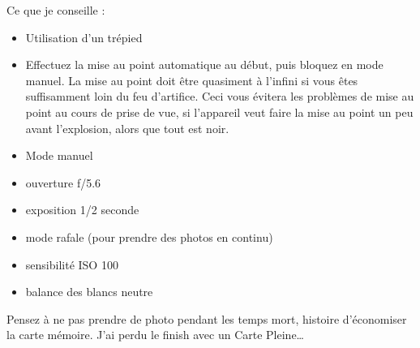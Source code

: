 \documentclass[a4paper,twoside]{article}
\begin{document}
Ce que je conseille : 
\begin{itemize}
\item Utilisation d'un trépied
\item Effectuez la mise au point automatique au début, puis bloquez en mode manuel. La mise au point doit être quasiment à l'infini si vous êtes suffisamment loin du feu d'artifice. Ceci vous évitera les problèmes de mise au point au cours de prise de vue, si l'appareil veut faire la mise au point un peu avant l'explosion, alors que tout est noir.
\item Mode manuel
\item ouverture f/5.6
\item exposition 1/2 seconde
\item mode rafale (pour prendre des photos en continu)
\item sensibilité ISO 100
\item balance des blancs neutre
\end{itemize}

\begin{remarque}
Pensez à ne pas prendre de photo pendant les temps mort, histoire d'économiser la carte mémoire. J'ai perdu le finish avec un \og Carte Pleine\fg\dots
\end{remarque}


\printindex
\end{document}
